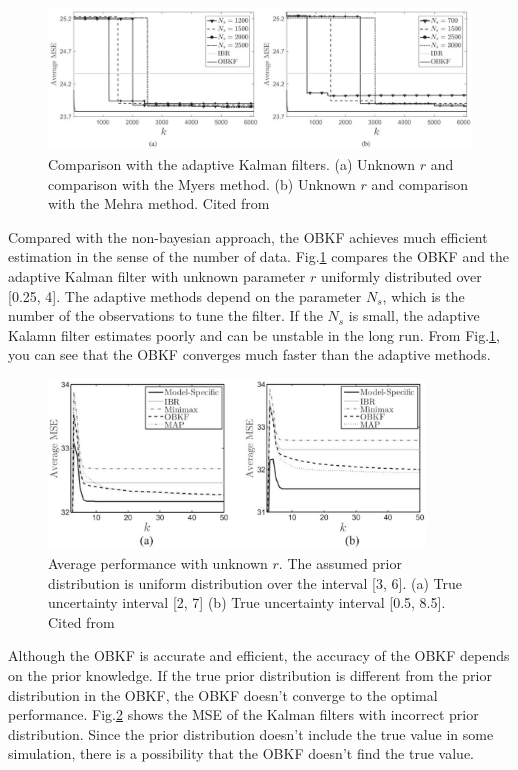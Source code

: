 \begin{figure}[h]
    \begin{center}
    \includegraphics[width=15cm]{img/cmp_adaptive.eps}
    \caption{Comparison with the adaptive Kalman filters. (a) Unknown $r$ and comparison with the Myers method. (b) Unknown $r$ and comparison with the Mehra method. Cited from \cite{Dehghannasiri2018}}
    \label{fig:cmp_adaptive}
    \end{center}
\end{figure}

Compared with the non-bayesian approach, the OBKF achieves much efficient estimation in the sense of the number of data. Fig.\ref{fig:cmp_adaptive} compares the OBKF and the adaptive Kalman filter with unknown parameter $r$ uniformly distributed over [0.25, 4]. The adaptive methods depend on the parameter $N_s$, which is the number of the observations to tune the filter. If the $N_s$ is small, the adaptive Kalamn filter estimates poorly and can be unstable in the long run. From Fig.\ref{fig:cmp_adaptive}, you can see that the OBKF converges much faster than the adaptive methods.

\begin{figure}[H]
    \begin{center}
    \includegraphics[width=10cm]{img/wrong_prior.eps}
    \caption{Average performance with unknown $r$. The assumed prior distribution is uniform distribution over the interval [3, 6]. (a) True uncertainty interval [2, 7] (b) True uncertainty interval [0.5, 8.5]. Cited from \cite{Dehghannasiri2018}}
    \label{fig:wrong_prior}
    \end{center}
\end{figure}

Although the OBKF is accurate and efficient, the accuracy of the OBKF depends on the prior knowledge. If the true prior distribution is different from the prior distribution in the OBKF, the OBKF doesn't converge to the optimal performance. Fig.\ref{fig:wrong_prior} shows the MSE of the Kalman filters with incorrect prior distribution. Since the prior distribution doesn't include the true value in some simulation, there is a possibility that the OBKF doesn't find the true value. 